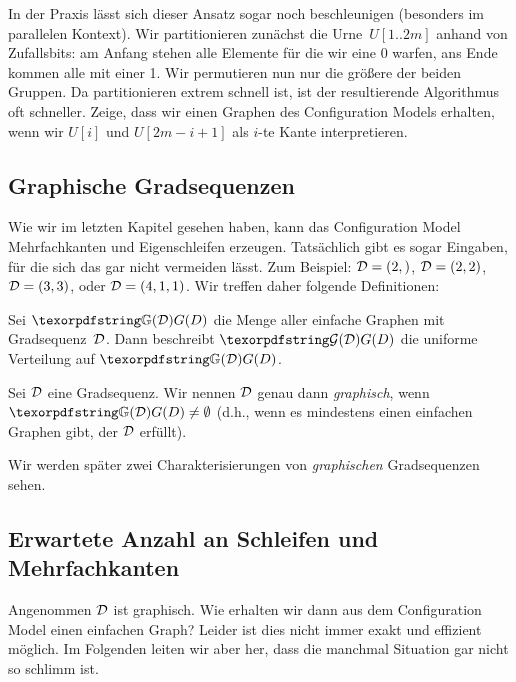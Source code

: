 \begin{exercise}
    In der Praxis lässt sich dieser Ansatz sogar noch beschleunigen (besonders im parallelen Kontext).
    Wir partitionieren zunächst die Urne~$U[1..2m]$ anhand von Zufallsbits:
    am Anfang stehen alle Elemente für die wir eine 0 warfen, ans Ende kommen alle mit einer 1.
    Wir permutieren nun nur die größere der beiden Gruppen.
    Da partitionieren extrem schnell ist, ist der resultierende Algorithmus oft schneller.
    Zeige, dass wir einen Graphen des Configuration Models erhalten, wenn wir $U[i]$ und $U[2m - i + 1]$ als $i$-te Kante interpretieren.
\end{exercise}

\subsection{Graphische Gradsequenzen}
Wie wir im letzten Kapitel gesehen haben, kann das Configuration Model Mehrfachkanten und Eigenschleifen erzeugen.
Tatsächlich gibt es sogar Eingaben, für die sich das gar nicht vermeiden lässt.
Zum Beispiel: $\mathcal{D} = (2,)$, $\mathcal{D} = (2, 2)$, $\mathcal{D} = (3,3)$, oder $\mathcal{D} = (4, 1, 1)$.
Wir treffen daher folgende Definitionen:

\begin{definition}
    Sei $\gd$ die Menge aller einfache Graphen mit Gradsequenz~$\mathcal{D}$.
    Dann beschreibt $\Gd$ die uniforme Verteilung auf $\gd$.
\end{definition}

\begin{definition}
    Sei $\mathcal{D}$ eine Gradsequenz.
    Wir nennen $\mathcal{D}$ genau dann \emph{graphisch}, wenn $\gd \neq \emptyset$ (d.h., wenn es mindestens einen einfachen Graphen gibt, der $\mathcal{D}$ erfüllt).
\end{definition}

\noindent
Wir werden später zwei Charakterisierungen von \emph{graphischen} Gradsequenzen sehen.

\subsection{Erwartete Anzahl an Schleifen und Mehrfachkanten}\label{subsec:anzahl-illegaler-kanten}
Angenommen $\mathcal{D}$ ist graphisch.
Wie erhalten wir dann aus dem Configuration Model einen einfachen Graph?
Leider ist dies nicht immer exakt und effizient möglich.
Im Folgenden leiten wir aber her, dass die manchmal Situation gar nicht so schlimm ist.

